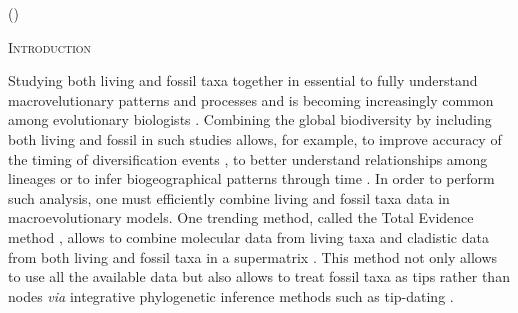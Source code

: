 \documentclass[12pt,letterpaper]{article}
\renewcommand{\section}[1]{%
\bigskip
\begin{center}
\begin{Large}
\normalfont\scshape #1
\medskip
\end{Large}
\end{center}}
\begin{document}
\noindent ()\\

\vspace{1.5in}

\newpage 

%
%

\section{Introduction}
Studying both living and fossil taxa together in essential to fully understand macrovelutionary patterns and processes and is becoming increasingly common among evolutionary biologists \citep{jacksonwhat2006,quentaldiversity2010,dietlconservation2011,slaterunifying2013,fritzdiversity2013,Wood01032013}.
Combining the global biodiversity by including both living and fossil in such studies allows, for example, to improve accuracy of the timing of diversification events \citep[e.g.][]{ronquista2012}, to better understand relationships among lineages \citep[e.g.][]{beckancient2014} or to infer biogeographical patterns through time \citep[e.g.][]{Meseguer01032015}.
In order to perform such analysis, one must efficiently combine living and fossil taxa data in macroevolutionary models.
One trending method, called the Total Evidence method \citep{eernissetaxonomic1993,ronquista2012}, allows to combine molecular data from living taxa and cladistic data from both living and fossil taxa in a supermatrix \citep[e.g.][]{pyrondivergence2011,ronquista2012,schragocombining2013,slaterunifying2013,beckancient2014,Meseguer01032015}.
This method not only allows to use all the available data but also allows to treat fossil taxa as tips rather than nodes \textit{via} integrative phylogenetic inference methods such as tip-dating \citep{ronquista2012,Drummond01082012,Wood01032013,BEASTmaster}.
\end{document}
